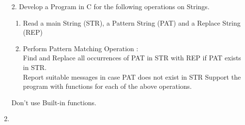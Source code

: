 \documentclass{article}
\newcommand{\answer}{\item [$\rightarrow$]}
\begin{document}
	\begin{enumerate}
		\item [2.] Develop a Program in C for the following operations on Strings.
		\begin{enumerate}[label=\alph*.]
			\item Read a main String (STR), a Pattern String (PAT) and a Replace String (REP)
			\item Perform Pattern Matching Operation : \\
			Find and Replace all occurrences of PAT in STR with REP if PAT exists in STR. \\
			Report suitable messages in case PAT does not exist in STR Support the program with functions for each of the above operations.
		\end{enumerate}
		Don't use Built-in functions.

		\answer \inputminted{c}{../Program2.c}
	\end{enumerate}
\end{document}
